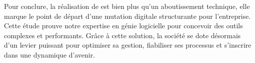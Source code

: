 Pour conclure, la réalisation de \reportAppName{}est bien plus qu’un aboutissement technique, elle marque le point de départ d’une mutation digitale structurante pour l’entreprise. Cette
étude prouve notre expertise en génie logicielle pour concevoir des outils complexes et
performants. Grâce à cette solution, la société \reportEntreprise se dote désormais d’un levier puissant
pour optimiser sa gestion, fiabiliser ses processus et s’inscrire dans une dynamique d’avenir.\\